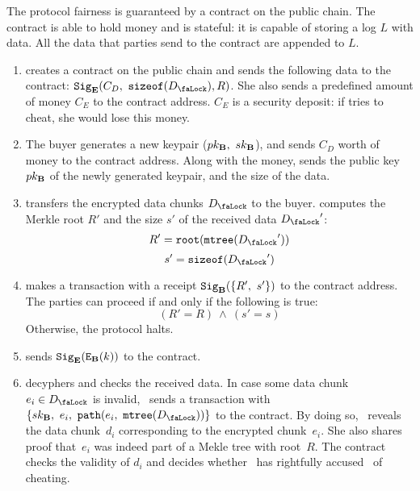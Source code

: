 The protocol fairness is guaranteed by a contract on the public chain. The contract is able to hold money and is stateful: it is capable of storing a log $L$ with data. All the data that parties send to the contract are appended to $L$.

\begin{enumerate}
\item {} creates a contract on the public chain and sends the following data to the contract: $\Sign_\Party{E}(C_D,\ \SizeOf(\Lock{D}), R)$. She also sends a predefined amount of money $C_E$ to the contract address. $C_E$ is a security deposit: if  tries to cheat, she would lose this money.
\item The buyer generates a new keypair ($pk_{\mathbf{B}},\ sk_{\mathbf{B}}$), and sends $C_D$ worth of money to the contract address. Along with the money,  sends the public key $pk_{\mathbf{B}}$ of the newly generated keypair, and the size of the data.
\item {} transfers the encrypted data chunks $\Lock{D}$ to the buyer.  computes the Merkle root $R'$ and the size $s'$ of the received data $\Lock{D}'$:
\begin{equation}
R' = \Root(\MerkleTree(\Lock{D}'))
\end{equation}
\begin{equation}
s' = \SizeOf(\Lock{D}')
\end{equation}
\item {} makes a transaction with a receipt $\mathtt{Sig}_{\mathbf{B}}(\{R',\ s'\})$ to the contract address. The parties can proceed if and only if the following is true:
\begin{equation}
(R' = R)\ \land\ (s' = s)
\end{equation}
Otherwise, the protocol halts.
\item {} sends $\mathtt{Sig}_{\mathbf{E}}(\mathtt{E}_{\mathbf{B}}(k))$ to the contract.
\item {} decyphers and checks the received data. In case some data chunk $e_i \in \Lock{D}$ is invalid, ~sends a transaction with~$\{\SecretKey{B},\ e_i,\ \Path(e_i,\ \MerkleTree(\Lock{D}))\}$ to the contract. By doing so, ~reveals the data chunk~$d_i$ corresponding to the encrypted chunk~$e_i$.  She also shares proof that~$e_i$ was indeed part of a  Mekle tree with root~$R$. The contract checks the validity of $d_i$ and decides whether ~has rightfully accused~ of cheating.
\end{enumerate}

